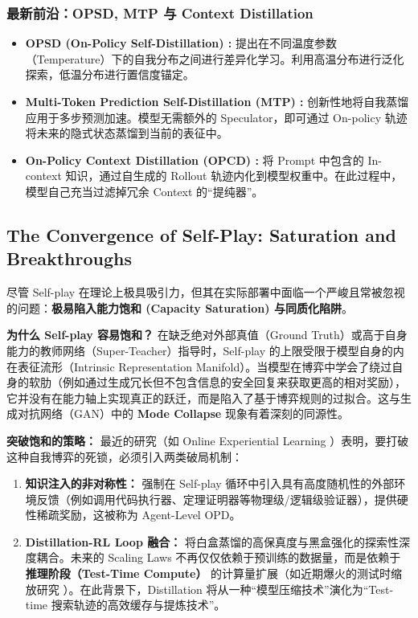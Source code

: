\documentclass{article}
\begin{document}
\subsubsection{最新前沿：OPSD, MTP 与 Context Distillation}
\begin{itemize}
    \item \textbf{OPSD (On-Policy Self-Distillation) \cite{2601.18734}:} 提出在不同温度参数（Temperature）下的自我分布之间进行差异化学习。利用高温分布进行泛化探索，低温分布进行置信度锚定。
    \item \textbf{Multi-Token Prediction Self-Distillation (MTP) \cite{2602.06019}:} 创新性地将自我蒸馏应用于多步预测加速。模型无需额外的 Speculator，即可通过 On-policy 轨迹将未来的隐式状态蒸馏到当前的表征中。
    \item \textbf{On-Policy Context Distillation (OPCD) \cite{2602.12275}:} 将 Prompt 中包含的 In-context 知识，通过自生成的 Rollout 轨迹内化到模型权重中。在此过程中，模型自己充当过滤掉冗余 Context 的“提纯器”。
\end{itemize}

\subsection{The Convergence of Self-Play: Saturation and Breakthroughs}
\label{subsec:self_play_convergence}

尽管 Self-play 在理论上极具吸引力，但其在实际部署中面临一个严峻且常被忽视的问题：\textbf{极易陷入能力饱和 (Capacity Saturation) 与同质化陷阱}。

\textbf{为什么 Self-play 容易饱和？} 
在缺乏绝对外部真值（Ground Truth）或高于自身能力的教师网络（Super-Teacher）指导时，Self-play 的上限受限于模型自身的内在表征流形（Intrinsic Representation Manifold）。当模型在博弈中学会了绕过自身的软肋（例如通过生成冗长但不包含信息的安全回复来获取更高的相对奖励），它并没有在能力轴上实现真正的跃迁，而是陷入了基于博弈规则的过拟合。这与生成对抗网络（GAN）中的 \textbf{Mode Collapse} 现象有着深刻的同源性。

\textbf{突破饱和的策略：} 
最近的研究（如 Online Experiential Learning \cite{2603.16856}）表明，要打破这种自我博弈的死锁，必须引入两类破局机制：
\begin{enumerate}
    \item \textbf{知识注入的非对称性：} 强制在 Self-play 循环中引入具有高度随机性的外部环境反馈（例如调用代码执行器、定理证明器等物理级/逻辑级验证器），提供硬性稀疏奖励，这被称为 Agent-Level OPD。
    \item \textbf{Distillation-RL Loop 融合：} 将白盒蒸馏的高保真度与黑盒强化的探索性深度耦合。未来的 Scaling Laws 不再仅仅依赖于预训练的数据量，而是依赖于\textbf{推理阶段（Test-Time Compute）} 的计算量扩展（如近期爆火的测试时缩放研究 \cite{2501.15585}）。在此背景下，Distillation 将从一种“模型压缩技术”演化为“Test-time 搜索轨迹的高效缓存与提炼技术”。
\end{enumerate}
\end{document}
